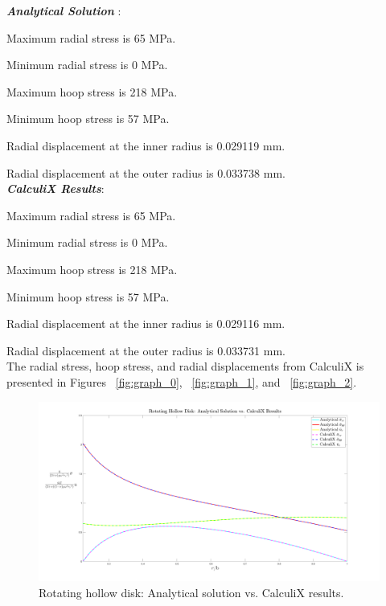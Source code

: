 \documentclass[12pt, a4paper, twoside]{article}
\begin{document}
\textbf{\emph{Analytical Solution}}  \cite{rotors_book}:

Maximum radial stress is 65 MPa.

Minimum radial stress is 0 MPa.

Maximum hoop stress is 218 MPa.

Minimum hoop stress is 57 MPa.

Radial displacement at the inner radius is 0.029119 mm.

Radial displacement at the outer radius is 0.033738 mm.\\


\textbf{\emph{CalculiX Results}}:

Maximum radial stress is 65 MPa.

Minimum radial stress is 0 MPa.

Maximum hoop stress is 218 MPa.

Minimum hoop stress is 57 MPa.


Radial displacement at the inner radius is 0.029116 mm.

Radial displacement at the outer radius is 0.033731 mm.\\

The radial stress, hoop stress, and radial displacements from CalculiX is presented in Figures ~\ref{fig:graph_0}, ~\ref{fig:graph_1}, and ~\ref{fig:graph_2}.


\begin{landscape}
\begin{figure}[h]
	\centering
	\includegraphics[scale=0.5]{rotating_disk_analytical_vs_fe}
	\caption{Rotating hollow disk: Analytical solution vs. CalculiX results.}
	\label{fig:rotating_disk_analytical_vs_fe}
\end{figure}
\end{landscape}
\end{document}
